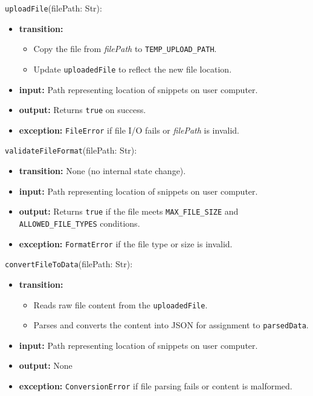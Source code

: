 \documentclass[12pt, titlepage]{article}
\begin{document}
\noindent \texttt{uploadFile}(filePath: Str):
\begin{itemize}
    \item \textbf{transition:}
    \begin{itemize}
        \item Copy the file from \textit{filePath} to \texttt{TEMP\_UPLOAD\_PATH}.
        \item Update \texttt{uploadedFile} to reflect the new file location.
    \end{itemize}
    \item \textbf{input:} Path representing location of snippets on user computer.
    \item \textbf{output:} Returns \texttt{true} on success.
    \item \textbf{exception:} \texttt{FileError} if file I/O fails or \textit{filePath} is invalid.
\end{itemize}

\noindent \texttt{validateFileFormat}(filePath: Str):
\begin{itemize}
    \item \textbf{transition:} None (no internal state change).
    \item \textbf{input:} Path representing location of snippets on user computer.
    \item \textbf{output:} Returns \texttt{true} if the file meets \texttt{MAX\_FILE\_SIZE} and 
    \texttt{ALLOWED\_FILE\_TYPES} conditions.
    \item \textbf{exception:} \texttt{FormatError} if the file type or size is invalid.
\end{itemize}

\noindent \texttt{convertFileToData}(filePath: Str):
\begin{itemize}
    \item \textbf{transition:}
    \begin{itemize}
        \item Reads raw file content from the \texttt{uploadedFile}.
        \item Parses and converts the content into JSON for assignment to \texttt{parsedData}.
    \end{itemize}
    \item \textbf{input:} Path representing location of snippets on user computer.
    \item \textbf{output:} None
    \item \textbf{exception:} \texttt{ConversionError} if file parsing fails or content is malformed.
\end{itemize}
\end{document}
